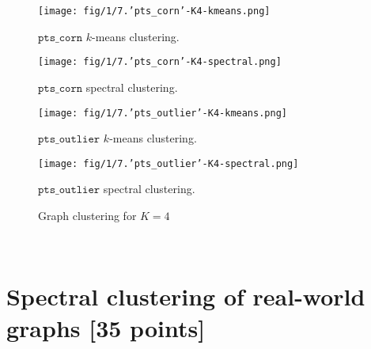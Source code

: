 \documentclass[unicode,11pt,a4paper,oneside,numbers=endperiod,openany]{scrartcl}
\begin{document}
\begin{figure}[h!]
\begin{minipage}{1\textwidth}
    \begin{minipage}{0.5\linewidth}
        \centering
        \texttt{[image: fig/1/7.'pts\_corn'-K4-kmeans.png]}
        \caption{$\texttt {pts\_corn}$ $k$-means clustering.}
    \end{minipage}
    \begin{minipage}{0.5\linewidth}
        \centering
        \texttt{[image: fig/1/7.'pts\_corn'-K4-spectral.png]}
        \caption{$\texttt {pts\_corn}$ spectral clustering.}
    \end{minipage}
    
    \begin{minipage}{0.5\linewidth}
        \centering
        \texttt{[image: fig/1/7.'pts\_outlier'-K4-kmeans.png]}
        \caption{$\texttt {pts\_outlier}$ $k$-means clustering.}
            \label{fig:pts_outlier-kmeans-k4}
    \end{minipage}
    \begin{minipage}{0.5\linewidth}
        \centering
        \texttt{[image: fig/1/7.'pts\_outlier'-K4-spectral.png]}
        \caption{$\texttt {pts\_outlier}$ spectral clustering.}
    \end{minipage}
\end{minipage}
    \caption{Graph clustering for $K = 4$}
    \label{fig:clustering-k4}
\end{figure}\\

\section{Spectral clustering of real-world graphs [35 points]}
\end{document}
